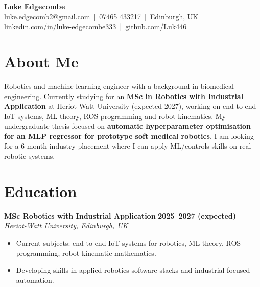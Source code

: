 \documentclass[a4paper,11pt]{article}
\begin{document}
\begin{center}
    {\LARGE \textbf{Luke Edgecombe}} \\[4pt]
    \href{mailto:luke.edgecomb2@gmail.com}{luke.edgecomb2@gmail.com} \,|\, 07465 433217 \,|\, Edinburgh, UK \\
    \href{https://linkedin.com/in/luke-edgecombe333}{linkedin.com/in/luke-edgecombe333} \,|\, 
    \href{https://github.com/Luk446}{github.com/Luk446}
\end{center}

\vspace{0.3cm}

\section*{About Me}
Robotics and machine learning engineer with a background in biomedical engineering. Currently studying for an \textbf{MSc in Robotics with Industrial Application} at Heriot-Watt University (expected 2027), working on end-to-end IoT systems, ML theory, ROS programming and robot kinematics. My undergraduate thesis focused on \textbf{automatic hyperparameter optimisation for an MLP regressor for prototype soft medical robotics}. I am looking for a 6-month industry placement where I can apply ML/controls skills on real robotic systems.

\section*{Education}

\textbf{MSc Robotics with Industrial Application} \hfill \textbf{2025--2027 (expected)}\\
\textit{Heriot-Watt University, Edinburgh, UK}
\begin{itemize}
    \item Current subjects: end-to-end IoT systems for robotics, ML theory, ROS programming, robot kinematic mathematics.
    \item Developing skills in applied robotics software stacks and industrial-focused automation.
\end{itemize}
\end{document}
